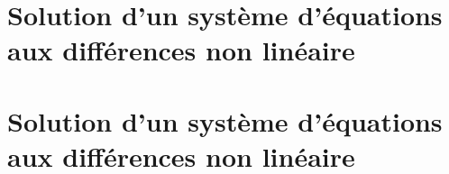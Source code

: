 \documentclass[12pt,a4paper]{book}
\begin{document}
\chapter{Solution d'un système d'équations aux différences non linéaire} 
\chapter{Solution d'un système d'équations aux différences non linéaire} 
\end{document}
